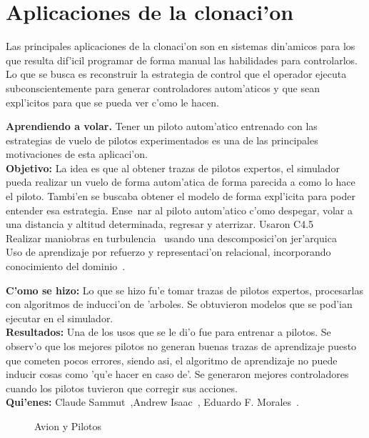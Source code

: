 \documentclass[11pt]{article}
\begin{document}
\section{Aplicaciones de la clonaci'on}
Las principales aplicaciones de la clonaci'on son en sistemas din'amicos para los que resulta dif'icil programar de forma manual las habilidades para controlarlos. Lo que se busca es reconstruir la estrategia de control que el operador ejecuta subconscientemente para generar controladores autom'aticos y que sean expl'icitos para que se pueda ver c'omo le hacen.



\textbf{Aprendiendo a volar.} Tener un piloto autom'atico entrenado con las estrategias de vuelo de pilotos experimentados es una de las principales motivaciones de esta aplicaci'on.\\
\textbf{Objetivo:} La idea es que al obtener trazas de pilotos expertos, el simulador pueda realizar un vuelo de forma autom'atica de forma parecida a como lo hace el piloto. Tambi'en se buscaba obtener el modelo de forma expl'icita para poder entender esa estrategia. Ense~nar al piloto autom'atico c'omo despegar, volar a una distancia y altitud determinada, regresar y aterrizar. Usaron C4.5~\cite{Sammut92learningto}\\
Realizar maniobras en turbulencia~\cite{Isaac03goal-directedlearning} usando una descomposici'on jer'arquica\\
Uso de aprendizaje por refuerzo y representaci'on relacional, incorporando conocimiento del dominio~\cite{Morales04learningto}.


\textbf{C'omo se hizo:} Lo que se hizo fu'e tomar trazas de pilotos expertos, procesarlas con algoritmos de inducci'on de 'arboles. Se obtuvieron modelos que se pod'ian ejecutar en el simulador. \\
\textbf{Resultados:} Una de los usos que se le di'o fue para entrenar a pilotos. Se observ'o que los mejores pilotos no generan buenas trazas de aprendizaje puesto que cometen pocos errores, siendo asi, el algoritmo de aprendizaje no puede inducir cosas como 'qu'e hacer en caso de'. Se generaron mejores controladores cuando los pilotos tuvieron que corregir sus acciones.\\
\textbf{Qui'enes:} Claude Sammut~\cite{Sammut92learningto},Andrew Isaac~\cite{Isaac03goal-directedlearning}, Eduardo F. Morales~\cite{Morales04learningto}.

\begin{figure}[h]
\begin{center}

\caption{Avion y Pilotos}
  \label{fig:volar}
\end{center}
\end{figure} 
\end{document}

